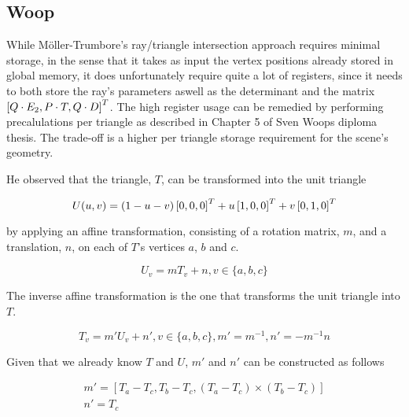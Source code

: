 \subsection{Woop}


While Möller-Trumbore's ray/triangle intersection approach requires minimal
storage, in the sense that it takes as input the vertex positions already stored
in global memory, it does unfortunately require quite a lot of registers, since
it needs to both store the ray's parameters aswell as the determinant and the
matrix $\left[Q \cdot E_2, P \cdot T, Q \cdot D \right]^T$. The high register usage
can be remedied by performing precalulations per triangle as described in
Chapter 5 of Sven Woops diploma thesis. The trade-off
is a higher per triangle storage requirement for the scene's geometry.




He observed that the triangle, $T$, can be transformed into the unit triangle

\begin{displaymath}
  U(u, v) = (1-u-v)\left[0, 0, 0 \right]^T + u\left[1, 0, 0 \right]^T + v\left[0, 1, 0 \right]^T
\end{displaymath}

by applying an affine transformation, consisting of a
rotation matrix, $m$, and a translation, $n$, on each of $T$'s vertices $a$, $b$
and $c$.

\begin{displaymath}
  U_v = m T_v + n, v \in \{a, b, c\}
\end{displaymath}

The inverse affine transformation is the one that transforms the unit
triangle into $T$.

\begin{displaymath}
  T_v = m' U_v + n', v \in \{a, b, c\}, m' = m^{-1}, n' = -m^{-1}n
\end{displaymath}

Given that we already know $T$ and $U$, $m'$ and $n'$ can be
constructed as follows

\begin{displaymath}
  \begin{array}{l}
    m' = \left[ T_a - T_c, T_b - T_c, (T_a - T_c) \times (T_b - T_c)
      \right]\\
    n' = T_c
  \end{array}
\end{displaymath}

